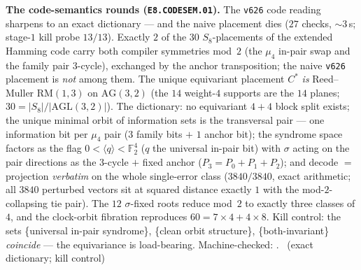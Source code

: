 \par\smallskip\noindent\textbf{The code-semantics rounds
(\texttt{E8.CODESEM.01}).}
The \texttt{v626} code reading sharpens to an exact dictionary ---
and the naive placement dies ($27$ checks, ${\sim}3$\,s; stage-$1$
kill probe $13/13$).  Exactly $2$ of the $30$ $S_8$-placements of the
extended Hamming code carry both compiler symmetries mod~$2$ (the
$\mu_4$ in-pair swap and the family pair $3$-cycle), exchanged by the
anchor transposition; the naive \texttt{v626} placement is \emph{not}
among them.  The unique equivariant placement $C^*$ \emph{is}
Reed--Muller $\mathrm{RM}(1,3)$ on $\mathrm{AG}(3,2)$ (the $14$
weight-$4$ supports are the $14$ planes; $30=|S_8|/|\mathrm{AGL}(3,2)|$).
The dictionary: no equivariant $4{+}4$ block split exists; the unique
minimal orbit of information sets is the transversal pair --- one
information bit per $\mu_4$ pair ($3$ family bits $+$ $1$ anchor bit);
the syndrome space factors as the flag
$0<\langle q\rangle<\mathbb F_2^4$ ($q$ the universal in-pair bit)
with $\sigma$ acting on the pair directions as the $3$-cycle $+$ fixed
anchor ($P_3=P_0{+}P_1{+}P_2$); and decode $=$ projection
\emph{verbatim} on the whole single-error class ($3840/3840$, exact
arithmetic; all $3840$ perturbed vectors sit at squared distance
exactly $1$ with the mod-$2$-collapsing tie pair).  The $12$
$\sigma$-fixed roots reduce mod~$2$ to exactly three classes of $4$,
and the clock-orbit fibration reproduces $60=7\times4+4\times8$.  Kill
control: the sets \{universal in-pair syndrome\}, \{clean orbit
structure\}, \{both-invariant\} \emph{coincide} --- the equivariance
is load-bearing.
Machine-checked: .
\mE\ (exact dictionary; kill control)
\par\smallskip

